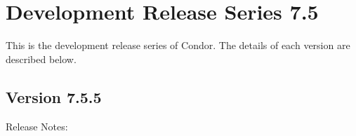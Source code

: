 
\section{\label{sec:History-7-5}Development Release Series 7.5}

This is the development release series of Condor.
The details of each version are described below.

\subsection*{\label{sec:New-7-5-5}Version 7.5.5}

\noindent Release Notes:

